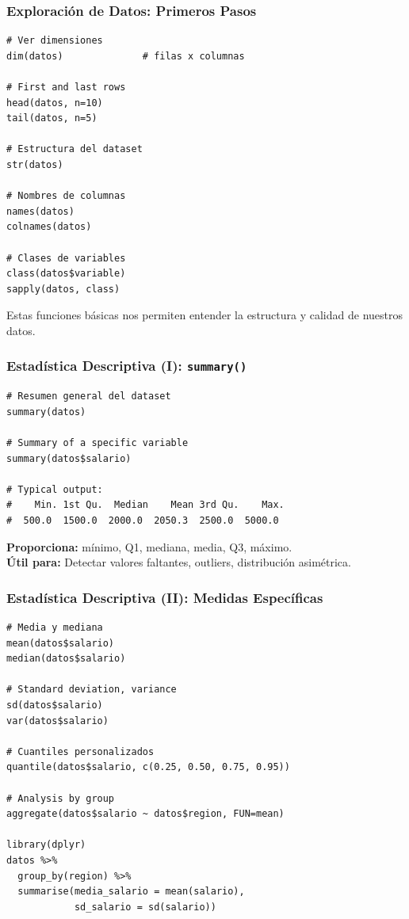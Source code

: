 \documentclass[aspectratio=169,11pt]{beamer}
\begin{document}
\begin{frame}[fragile]
  \frametitle{Exploración de Datos: Primeros Pasos}

  \begin{lstlisting}
# Ver dimensiones
dim(datos)              # filas x columnas

# First and last rows
head(datos, n=10)
tail(datos, n=5)

# Estructura del dataset
str(datos)

# Nombres de columnas
names(datos)
colnames(datos)

# Clases de variables
class(datos$variable)
sapply(datos, class)
  \end{lstlisting}

  \small Estas funciones básicas nos permiten entender la estructura y calidad de nuestros datos.
\end{frame}

\begin{frame}[fragile]
  \frametitle{Estadística Descriptiva (I): \texttt{summary()}}

  \begin{lstlisting}
# Resumen general del dataset
summary(datos)

# Summary of a specific variable
summary(datos$salario)

# Typical output:
#    Min. 1st Qu.  Median    Mean 3rd Qu.    Max.
#  500.0  1500.0  2000.0  2050.3  2500.0  5000.0
  \end{lstlisting}

  \vspace{0.3cm}
  \small
  \textbf{Proporciona:} mínimo, Q1, mediana, media, Q3, máximo.\\
  \textbf{Útil para:} Detectar valores faltantes, outliers, distribución asimétrica.
\end{frame}

\begin{frame}[fragile]
  \frametitle{Estadística Descriptiva (II): Medidas Específicas}

  \begin{lstlisting}
# Media y mediana
mean(datos$salario)
median(datos$salario)

# Standard deviation, variance
sd(datos$salario)
var(datos$salario)

# Cuantiles personalizados
quantile(datos$salario, c(0.25, 0.50, 0.75, 0.95))

# Analysis by group
aggregate(datos$salario ~ datos$region, FUN=mean)

library(dplyr)
datos %>%
  group_by(region) %>%
  summarise(media_salario = mean(salario),
            sd_salario = sd(salario))
  \end{lstlisting}
\end{frame}
\end{document}
